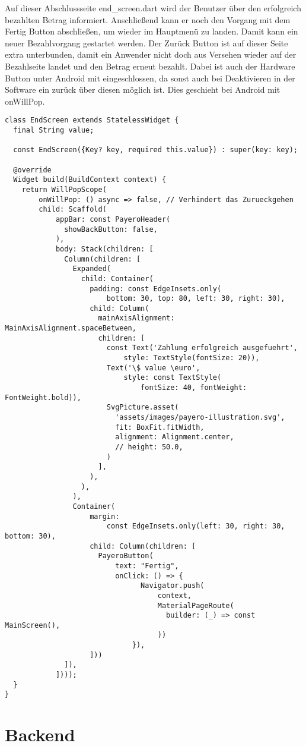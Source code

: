 Auf dieser Abschlussseite \glqq end\_screen.dart\grqq{} wird der Benutzer über den erfolgreich bezahlten Betrag informiert.
Anschließend kann er noch den Vorgang mit dem \glqq Fertig\grqq{} Button abschließen, um wieder im Hauptmenü zu landen.
Damit kann ein neuer Bezahlvorgang gestartet werden.
Der \glqq Zurück\grqq{} Button ist auf dieser Seite extra unterbunden, damit ein Anwender nicht doch aus Versehen wieder auf der Bezahlseite landet und den Betrag erneut bezahlt.
Dabei ist auch der Hardware Button unter Android mit eingeschlossen, da sonst auch bei Deaktivieren in der Software ein zurück über diesen möglich ist.
Dies geschieht bei Android mit \glqq onWillPop\grqq{}.

\begin{lstlisting}[caption={EndScreen bei erfolgreichem Bezahlvorgang}]
  class EndScreen extends StatelessWidget {
  final String value;

  const EndScreen({Key? key, required this.value}) : super(key: key);

  @override
  Widget build(BuildContext context) {
    return WillPopScope(
        onWillPop: () async => false, // Verhindert das Zurueckgehen
        child: Scaffold(
            appBar: const PayeroHeader(
              showBackButton: false,
            ),
            body: Stack(children: [
              Column(children: [
                Expanded(
                  child: Container(
                    padding: const EdgeInsets.only(
                        bottom: 30, top: 80, left: 30, right: 30),
                    child: Column(
                      mainAxisAlignment: MainAxisAlignment.spaceBetween,
                      children: [
                        const Text('Zahlung erfolgreich ausgefuehrt',
                            style: TextStyle(fontSize: 20)),
                        Text('\$ value \euro',
                            style: const TextStyle(
                                fontSize: 40, fontWeight: FontWeight.bold)),
                        SvgPicture.asset(
                          'assets/images/payero-illustration.svg',
                          fit: BoxFit.fitWidth,
                          alignment: Alignment.center,
                          // height: 50.0,
                        )
                      ],
                    ),
                  ),
                ),
                Container(
                    margin:
                        const EdgeInsets.only(left: 30, right: 30, bottom: 30),
                    child: Column(children: [
                      PayeroButton(
                          text: "Fertig",
                          onClick: () => {
                                Navigator.push(
                                    context,
                                    MaterialPageRoute(
                                      builder: (_) => const MainScreen(),
                                    ))
                              }),
                    ]))
              ]),
            ])));
  }
}
\end{lstlisting}

\section{Backend}

